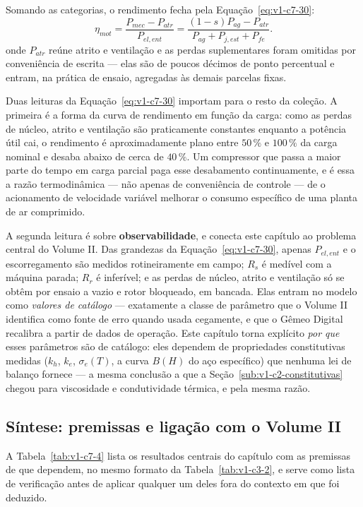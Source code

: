 \documentclass[12pt,a4paper]{article}
\numberwithin{equation}{section}
\numberwithin{table}{section}
\numberwithin{figure}{section}
\begin{document}
Somando as categorias, o rendimento fecha pela
Equação~\eqref{eq:v1-c7-30}:
\begin{equation}\label{eq:v1-c7-30}
\eta_{mot} = \frac{P_{mec} - P_{atr}}{P_{el,ent}}
= \frac{(1-s)P_{ag} - P_{atr}}{P_{ag} + P_{j,est} + P_{fe}} .
\end{equation}
onde $P_{atr}$ reúne atrito e ventilação e as perdas suplementares foram
omitidas por conveniência de escrita --- elas são de poucos décimos de ponto
percentual e entram, na prática de ensaio, agregadas às demais parcelas fixas.

Duas leituras da Equação~\eqref{eq:v1-c7-30} importam para o resto da coleção.
A primeira é a forma da curva de rendimento em função da carga: como as perdas
de núcleo, atrito e ventilação são praticamente constantes enquanto a potência
útil cai, o rendimento é aproximadamente plano entre $50\,\%$ e $100\,\%$ da
carga nominal e desaba abaixo de cerca de $40\,\%$. Um compressor que passa a
maior parte do tempo em carga parcial paga esse desabamento continuamente, e é
essa a razão termodinâmica --- não apenas de conveniência de controle --- de o
acionamento de velocidade variável melhorar o consumo específico de uma
planta de ar comprimido.

A segunda leitura é sobre \textbf{observabilidade}, e conecta este capítulo ao
problema central do Volume II. Das grandezas da
Equação~\eqref{eq:v1-c7-30}, apenas $P_{el,ent}$ e o escorregamento são
medidos rotineiramente em campo; $R_s$ é medível com a máquina parada; $R_r$ é
inferível; e as perdas de núcleo, atrito e ventilação só se obtêm por ensaio a
vazio e rotor bloqueado, em bancada. Elas entram no modelo como \emph{valores
de catálogo} --- exatamente a classe de parâmetro que o Volume II identifica
como fonte de erro quando usada cegamente, e que o Gêmeo Digital recalibra a
partir de dados de operação. Este capítulo torna explícito \emph{por que} esses
parâmetros são de catálogo: eles dependem de propriedades constitutivas
medidas ($k_h$, $k_e$, $\sigma_e(T)$, a curva $B(H)$ do aço específico) que
nenhuma lei de balanço fornece --- a mesma conclusão a que a
Seção~\ref{sub:v1-c2-constitutivas} chegou para viscosidade e condutividade
térmica, e pela mesma razão.

\subsection{Síntese: premissas e ligação com o Volume
II}\label{sub:v1-c7-sintese}

A Tabela~\ref{tab:v1-c7-4} lista os resultados centrais do capítulo com as
premissas de que dependem, no mesmo formato da Tabela~\ref{tab:v1-c3-2}, e
serve como lista de verificação antes de aplicar qualquer um deles fora do
contexto em que foi deduzido.
\end{document}
